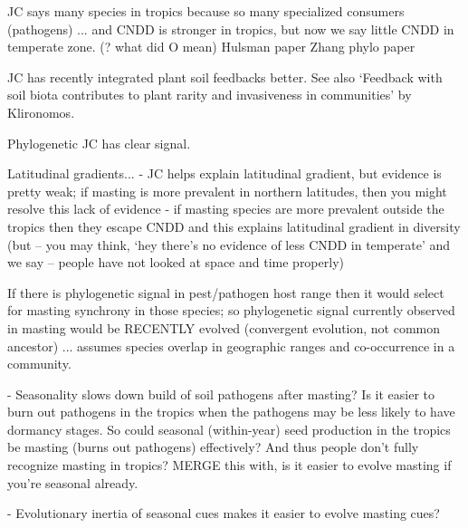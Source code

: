 \documentclass[11pt]{article}
\begin{document}
JC says many species in tropics because so many specialized consumers (pathogens) ... and CNDD is stronger in tropics, but now we say little CNDD in temperate zone. (? what did O mean)
Hulsman paper %
Zhang phylo paper %

JC has recently integrated plant soil feedbacks better. 
See also `Feedback with soil biota contributes to plant rarity and invasiveness in communities' by Klironomos. 

Phylogenetic JC has clear signal. 

Latitudinal gradients... 
	- JC helps explain latitudinal gradient, but evidence is pretty weak; if masting is more prevalent in northern latitudes, then you might resolve this lack of evidence 
	- if masting species are more prevalent outside the tropics then they escape CNDD and this explains latitudinal gradient in diversity (but -- you may think, `hey there's no evidence of less CNDD in temperate' and we say -- people have not looked at space and time properly)
	
If there is phylogenetic signal in pest/pathogen host range then it would select for masting synchrony in those species; so phylogenetic signal currently observed in masting would be RECENTLY evolved (convergent evolution, not common ancestor) ... assumes species overlap in geographic ranges and co-occurrence in a community. 
	
- Seasonality slows down build of soil pathogens after masting? Is it easier to burn out pathogens in the tropics when the pathogens may be less likely to have dormancy stages. So could seasonal (within-year) seed production in the tropics be masting (burns out pathogens) effectively? And thus people don't fully recognize masting in tropics? MERGE this with, is it easier to evolve masting if you're seasonal already.

- Evolutionary inertia of seasonal cues makes it easier to evolve masting cues? 


\end{document}
